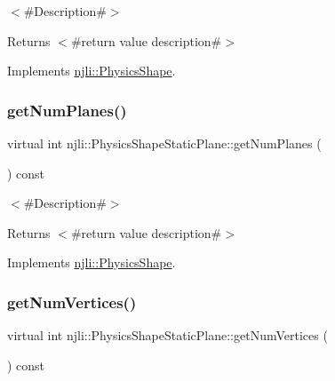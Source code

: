 $<$\#\+Description\#$>$

\begin{DoxyReturn}{Returns}
$<$\#return value description\#$>$ 
\end{DoxyReturn}


Implements \mbox{\hyperlink{classnjli_1_1_physics_shape_a24df999ba2b7ac0d9abda09c4f17c2fe}{njli\+::\+Physics\+Shape}}.

\mbox{\label{classnjli_1_1_physics_shape_static_plane_a7602280dd520ca98ec426278cb8e3681}} 
\subsubsection{\texorpdfstring{get\+Num\+Planes()}{getNumPlanes()}}
{\footnotesize\ttfamily virtual int njli\+::\+Physics\+Shape\+Static\+Plane\+::get\+Num\+Planes (\begin{DoxyParamCaption}{ }\end{DoxyParamCaption}) const\hspace{0.3cm}{\ttfamily [virtual]}}

$<$\#\+Description\#$>$

\begin{DoxyReturn}{Returns}
$<$\#return value description\#$>$ 
\end{DoxyReturn}


Implements \mbox{\hyperlink{classnjli_1_1_physics_shape_a11cb80220393bfce177b8bdc34f7f359}{njli\+::\+Physics\+Shape}}.

\mbox{\label{classnjli_1_1_physics_shape_static_plane_ab17422166a9a96672d671f8843c49f26}} 
\subsubsection{\texorpdfstring{get\+Num\+Vertices()}{getNumVertices()}}
{\footnotesize\ttfamily virtual int njli\+::\+Physics\+Shape\+Static\+Plane\+::get\+Num\+Vertices (\begin{DoxyParamCaption}{ }\end{DoxyParamCaption}) const\hspace{0.3cm}{\ttfamily [virtual]}}

